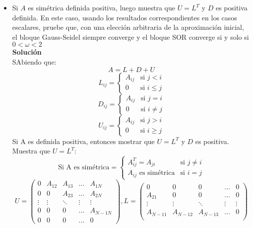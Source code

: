 \begin{itemize}
\item Si $A$ es simétrica definida positiva, luego muestra que $U=L^T$ y $D$ es positiva definida. En este caso, usando los resultados correspondientes en los casos escalares, pruebe que, con una elección arbitraria de la aproximación inicial, el bloque Gauss-Seidel siempre converge y el bloque SOR converge si y solo si $0<\omega<2$\\
\textbf{Solución}\\
SAbiendo que:\\
\[A= L + D + U\]
\[L_{ij} =
\begin{cases} 
      A_{ij}    & \mbox{si }  j < i  \\
      0         & \mbox{si } i \leq j 
\end{cases}\]
\[D_{ij} =
\begin{cases} 
      A_{ij}    & \mbox{si }  j = i  \\
      0         & \mbox{si } i \neq j 
\end{cases}\]
\[U_{ij} =
\begin{cases} 
      A_{ij}    & \mbox{si }  j > i  \\
      0         & \mbox{si } i \geq j 
\end{cases}\]
Si A es definida positiva, entonces mostrar que $U= L ^T$ y $D$ es positiva.\\
Muestra que $U=L^T$:
\[\text{Si A es simétrica} =
\begin{cases} 
      A_{ij}^T=A_{ji}    & \mbox{si }  j \neq i  \\
      A_{ij} \text{ es simétrica} & \mbox{si } i = j 
\end{cases}\]
$$
    U=\begin{pmatrix}
      0 &  A_{12} & A_{13} & \ldots &  A_{1N} \\
      0 &  0      & A_{23} & \ldots &  A_{2N} \\
      \vdots & \vdots  & \ddots & \vdots & \vdots \\
      0 &  0      & 0      & \ldots &  A_{N-1 N} \\
      0 &  0      & 0      & \ldots &  0 
    \end{pmatrix},
    L=\begin{pmatrix}
      0 &  0 & 0 & \ldots &  0 \\
      A_{21} &  0   & 0 & \ldots &  0 \\
      \vdots & \vdots  & \ddots & \vdots & \vdots \\
      A_{N-1 1} &  A_{N-1 2}      & A_{N-1 3}      & \ldots &  0 \\

\end{pmatrix}$$
\end{itemize}
